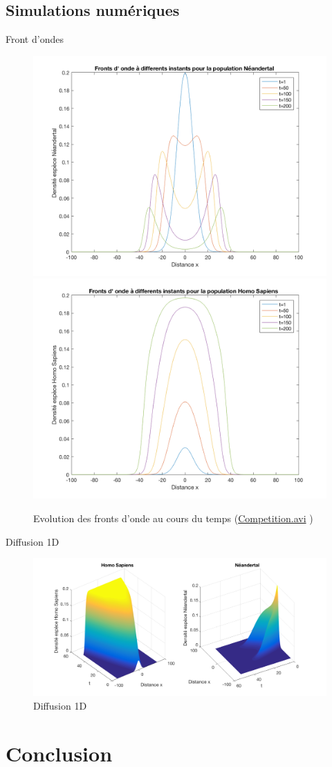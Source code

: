 \documentclass[10pt]{beamer}
\begin{document}
\subsection{Simulations numériques}
\begin{frame}{Front d'ondes}{}
\begin{figure}[H]
\centering
\includegraphics[width=0.48\linewidth]{Comp/neand.png}
\includegraphics[width=0.48\linewidth]{Comp/homo.png}
\caption{Evolution des fronts d'onde au cours du temps (\url{Competition.avi} )}
\end{figure}
\end{frame}

\begin{frame}{Diffusion 1D}{}
\begin{figure}[H]
\centering
\includegraphics[scale=0.2]{Comp/CompDiff2.png}
\caption{Diffusion 1D}
\end{figure}
\end{frame}

\section{Conclusion}
\end{document}
